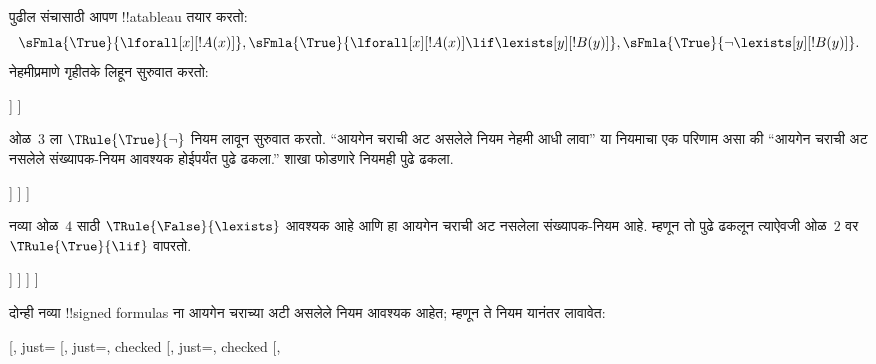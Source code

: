 \documentclass[../../../include/open-logic-section]{subfiles}
\begin{document}
\begin{ex}
पुढील संचासाठी आपण !!a{tableau} तयार करतो:
\[
\sFmla{\True}{\lforall[x][!A(x)]}, \sFmla{\True}{\lforall[x][!A(x)] 
  \lif \lexists[y][!B(y)]}, \sFmla{\True}{\lnot\lexists[y][!B(y)]}.
\]
नेहमीप्रमाणे गृहीतके लिहून सुरुवात करतो:
\begin{oltableau}
  [\sFmla{\True}{\lforall[x][\formula{A}(x)]}, just=\TAss
    [\sFmla{\True}{\lforall[x][\formula{A}(x)] \lif
        \lexists[y][\formula{B}(y)]}, just=\TAss
      [\sFmla{\True}{\lnot\lexists[y][\formula{B}(y)]}, just=\TAss
      ]
    ]
  ]
\end{oltableau}
ओळ~$3$ ला $\TRule{\True}{\lnot}$ नियम लावून सुरुवात करतो. ``आयगेन
चराची अट असलेले नियम नेहमी आधी लावा'' या नियमाचा एक परिणाम असा की
``आयगेन चराची अट नसलेले संख्यापक-नियम आवश्यक होईपर्यंत पुढे ढकला.''
शाखा फोडणारे नियमही पुढे ढकला.
\begin{oltableau}
  [\sFmla{\True}{\lforall[x][\formula{A}(x)]}, just=\TAss
    [\sFmla{\True}{\lforall[x][\formula{A}(x)] \lif
        \lexists[y][\formula{B}(y)]}, just=\TAss
      [\sFmla{\True}{\lnot\lexists[y][\formula{B}(y)]}, just=\TAss, checked
        [\sFmla{\False}{\lexists[y][\formula{B}(y)]}, just={\TRule{\True}{\lnot}[3]}]
      ]
    ]
  ]
\end{oltableau}
नव्या ओळ~$4$ साठी $\TRule{\False}{\lexists}$ आवश्यक आहे आणि हा आयगेन
चराची अट नसलेला संख्यापक-नियम आहे. म्हणून तो पुढे ढकलून त्याऐवजी ओळ~$2$
वर $\TRule{\True}{\lif}$ वापरतो.
\begin{oltableau}
  [\sFmla{\True}{\lforall[x][\formula{A}(x)]}, just=\TAss
    [\sFmla{\True}{\lforall[x][\formula{A}(x)] \lif
        \lexists[y][\formula{B}(y)]}, just=\TAss, checked
      [\sFmla{\True}{\lnot\lexists[y][\formula{B}(y)]}, just=\TAss, checked
        [\sFmla{\False}{\lexists[y][\formula{B}(y)]},
          just={\TRule{\True}{\lnot}[3]},
          [\sFmla{\False}{\lforall[x][\formula{A}(x)]}, just={\TRule{\True}{\lif}[2]}]
          [\sFmla{\True}{\lexists[y][\formula{B}(y)]}, just={\TRule{\True}{\lif}[2]}]
        ]
      ]
    ]
  ]
\end{oltableau}
दोन्ही नव्या !!{signed formula}s ना आयगेन चराच्या अटी असलेले नियम आवश्यक
आहेत; म्हणून ते नियम यानंतर लावावेत:
\begin{oltableau}
  [\sFmla{\True}{\lforall[x][\formula{A}(x)]}, just=\TAss
    [\sFmla{\True}{\lforall[x][\formula{A}(x)] \lif
        \lexists[y][\formula{B}(y)]}, just=\TAss, checked
      [\sFmla{\True}{\lnot\lexists[y][\formula{B}(y)]}, just=\TAss, checked
        [\sFmla{\False}{\lexists[y][\formula{B}(y)]},

\end{oltableau}
\end{ex}
\end{document}
